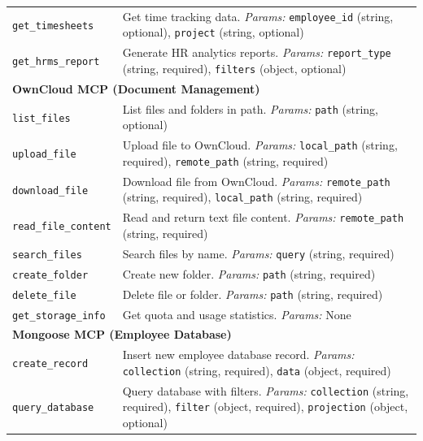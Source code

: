 \documentclass{article}
\theoremstyle{plain}
\theoremstyle{definition}
\theoremstyle{remark}
\begin{document}
{\begin{longtable}{p{4.5cm} p{10cm}}
\texttt{get\_timesheets} & Get time tracking data. \textit{Params:} \texttt{employee\_id} (string, optional), \texttt{project} (string, optional) \\

\texttt{get\_hrms\_report} & Generate HR analytics reports. \textit{Params:} \texttt{report\_type} (string, required), \texttt{filters} (object, optional) \\

\multicolumn{2}{l}{\textbf{OwnCloud MCP (Document Management)}} \\
\texttt{list\_files} & List files and folders in path. \textit{Params:} \texttt{path} (string, optional) \\

\texttt{upload\_file} & Upload file to OwnCloud. \textit{Params:} \texttt{local\_path} (string, required), \texttt{remote\_path} (string, required) \\

\texttt{download\_file} & Download file from OwnCloud. \textit{Params:} \texttt{remote\_path} (string, required), \texttt{local\_path} (string, required) \\

\texttt{read\_file\_content} & Read and return text file content. \textit{Params:} \texttt{remote\_path} (string, required) \\

\texttt{search\_files} & Search files by name. \textit{Params:} \texttt{query} (string, required) \\

\texttt{create\_folder} & Create new folder. \textit{Params:} \texttt{path} (string, required) \\

\texttt{delete\_file} & Delete file or folder. \textit{Params:} \texttt{path} (string, required) \\

\texttt{get\_storage\_info} & Get quota and usage statistics. \textit{Params:} None \\

\multicolumn{2}{l}{\textbf{Mongoose MCP (Employee Database)}} \\
\texttt{create\_record} & Insert new employee database record. \textit{Params:} \texttt{collection} (string, required), \texttt{data} (object, required) \\

\texttt{query\_database} & Query database with filters. \textit{Params:} \texttt{collection} (string, required), \texttt{filter} (object, required), \texttt{projection} (object, optional) \\


\end{longtable}}
\end{document}
